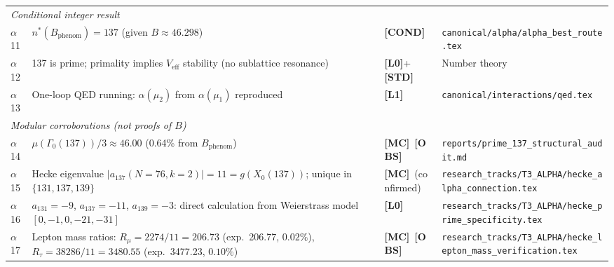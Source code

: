 \documentclass[12pt,a4paper]{article}
\theoremstyle{definition}
\theoremstyle{remark}
\newcommand{\Lzero}{\textbf{[L0]}}
\newcommand{\Lone}{\textbf{[L1]}}
\newcommand{\STD}{\textbf{[STD]}}
\newcommand{\MC}{\textbf{[MC]}}
\newcommand{\COND}{\textbf{[COND]}}
\newcommand{\OBS}{\textbf{[OBS]}}
\begin{document}
\begin{longtable}{p{0.8cm} p{6.8cm} p{1.6cm} p{4.5cm}}
\multicolumn{4}{l}{\textit{Conditional integer result}} \\[2pt]
$\alpha$11 & $n^*(B_{\mathrm{phenom}}) = 137$ (given $B \approx 46.298$) & \COND &
  \texttt{canonical/alpha/alpha\_best\_route.tex} \\[4pt]
$\alpha$12 & 137 is prime; primality implies $V_{\mathrm{eff}}$ stability (no sublattice
  resonance) & \Lzero + \STD &
  Number theory \\[4pt]
$\alpha$13 & One-loop QED running: $\alpha(\mu_2)$ from $\alpha(\mu_1)$
  reproduced & \Lone &
  \texttt{canonical/interactions/qed.tex} \\[8pt]

\multicolumn{4}{l}{\textit{Modular corroborations (not proofs of $B$)}} \\[2pt]
$\alpha$14 & $\mu(\Gamma_0(137))/3 \approx 46.00$ (0.64\% from $B_{\mathrm{phenom}}$) &
  \MC\ \OBS &
  \texttt{reports/prime\_137\_structural\_audit.md} \\[4pt]
$\alpha$15 & Hecke eigenvalue $|a_{137}(N{=}76, k{=}2)| = 11 = g(X_0(137))$;
  unique in $\{131,137,139\}$ & \MC\ (confirmed) &
  \texttt{research\_tracks/T3\_ALPHA/hecke\_alpha\_connection.tex} \\[4pt]
$\alpha$16 & $a_{131}=-9$, $a_{137}=-11$, $a_{139}=-3$: direct calculation from
  Weierstrass model $[0,-1,0,-21,-31]$ & \Lzero &
  \texttt{research\_tracks/T3\_ALPHA/hecke\_prime\_specificity.tex} \\[4pt]
$\alpha$17 & Lepton mass ratios: $R_\mu = 2274/11 = 206.73$ (exp.\ 206.77, $0.02\%$),
  $R_\tau = 38286/11 = 3480.55$ (exp.\ 3477.23, $0.10\%$) & \MC\ \OBS &
  \texttt{research\_tracks/T3\_ALPHA/hecke\_lepton\_mass\_verification.tex} \\[8pt]


\end{longtable}
\end{document}
